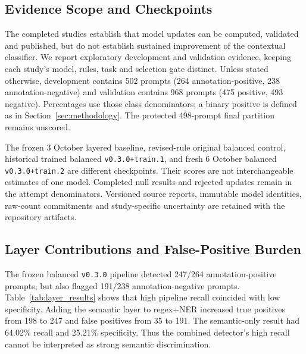 \documentclass[conference]{IEEEtran}
\begin{document}
\subsection{Evidence Scope and Checkpoints}

The completed studies establish that model updates can be computed, validated and published, but do not establish sustained improvement of the contextual classifier. We report exploratory development and validation evidence, keeping each study's model, rules, task and selection gate distinct. Unless stated otherwise, development contains 502 prompts (264 annotation-positive, 238 annotation-negative) and validation contains 968 prompts (475 positive, 493 negative). Percentages use those class denominators; a binary positive is defined as in Section~\ref{sec:methodology}. The protected 498-prompt final partition remains unscored.

The frozen 3 October layered baseline, revised-rule original balanced control, historical trained balanced \texttt{v0.3.0+train.1}, and fresh 6 October balanced \texttt{v0.3.0+train.2} are different checkpoints. Their scores are not interchangeable estimates of one model. Completed null results and rejected updates remain in the attempt denominators. Versioned source reports, immutable model identities, raw-count commitments and study-specific uncertainty are retained with the repository artifacts.

\subsection{Layer Contributions and False-Positive Burden}

The frozen balanced \texttt{v0.3.0} pipeline detected 247/264 annotation-positive prompts, but also flagged 191/238 annotation-negative prompts. Table~\ref{tab:layer_results} shows that high pipeline recall coincided with low specificity. Adding the semantic layer to regex+NER increased true positives from 198 to 247 and false positives from 35 to 191. The semantic-only result had 64.02\% recall and 25.21\% specificity. Thus the combined detector's high recall cannot be interpreted as strong semantic discrimination.
\end{document}
